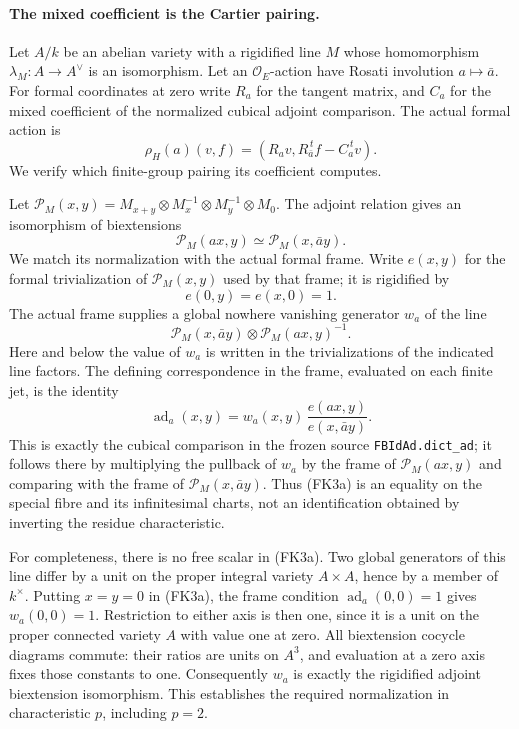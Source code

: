 \paragraph{The mixed coefficient is the Cartier pairing.}
Let \(A/k\) be an abelian variety with a rigidified line \(M\)
whose homomorphism \(\lambda_M:A\to A^\vee\) is an isomorphism.
Let an \(\mathcal O_E\)-action have Rosati involution \(a\mapsto\bar a\).
For formal coordinates at zero write \(R_a\) for the tangent
matrix, and \(C_a\) for the mixed coefficient of the normalized
cubical adjoint comparison.
The actual formal action is
\[
 \rho_H(a)(v,f)=(R_av,R_{\bar a}^{\,t}f-C_a^{\,t}v).
 \tag{FK2}
\]
We verify which finite-group pairing its coefficient computes.

Let
\(\mathcal P_M(x,y)=M_{x+y}\otimes M_x^{-1}\otimes M_y^{-1}\otimes M_0\).
The adjoint relation gives an isomorphism of biextensions
\[
               \mathcal P_M(ax,y)
                            \simeq\mathcal P_M(x,\bar a y).
 \tag{FK3}
\]
We match its normalization with the actual formal frame.
Write \(e(x,y)\) for the formal trivialization of
\(\mathcal P_M(x,y)\) used by that frame; it is rigidified by
\[
                         e(0,y)=e(x,0)=1.
\]
The actual frame supplies a global nowhere vanishing generator
\(w_a\) of the line
\[
        \mathcal P_M(x,\bar a y)\otimes
                                      \mathcal P_M(ax,y)^{-1}.
\]
Here and below the value of \(w_a\) is written in the
trivializations of the indicated line factors.
The defining correspondence in the frame, evaluated on each
finite jet, is the identity
\[
 \operatorname{ad}_a(x,y)
       =w_a(x,y)\,\frac{e(ax,y)}{e(x,\bar a y)} .
 \tag{FK3a}
\]
This is exactly the cubical comparison in the frozen source
\texttt{FBIdAd.dict\_ad}; it follows there by multiplying the
pullback of \(w_a\) by the frame of \(\mathcal P_M(ax,y)\)
and comparing with the frame of
\(\mathcal P_M(x,\bar a y)\).
Thus (FK3a) is an equality on the special fibre and its
infinitesimal charts, not an identification obtained by
inverting the residue characteristic.

For completeness, there is no free scalar in (FK3a).
Two global generators of this line differ by a unit on the
proper integral variety \(A\times A\), hence by a member of
\(k^\times\).
Putting \(x=y=0\) in (FK3a), the frame condition
\(\operatorname{ad}_a(0,0)=1\) gives \(w_a(0,0)=1\).
Restriction to either axis is then one, since it is a unit
on the proper connected variety \(A\) with value one at zero.
All biextension cocycle diagrams commute: their ratios are
units on \(A^3\), and evaluation at a zero axis fixes those
constants to one.
Consequently \(w_a\) is exactly the rigidified adjoint
biextension isomorphism.  This establishes the required
normalization in characteristic \(p\), including \(p=2\).

